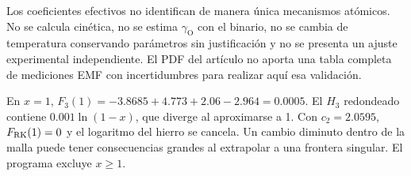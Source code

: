 Los coeficientes efectivos no identifican de manera única mecanismos atómicos. No se calcula cinética, no se estima $\gamma_{\mathrm O}$ con el binario, no se cambia de temperatura conservando parámetros sin justificación y no se presenta un ajuste experimental independiente. El PDF del artículo no aporta una tabla completa de mediciones EMF con incertidumbres para realizar aquí esa validación.

En $x=1$, $F_3(1)=-3.8685+4.773+2.06-2.964=0.0005$. El $H_3$ redondeado contiene $0.001\ln(1-x)$, que diverge al aproximarse a 1. Con $c_2=2.0595$, $F_{\mathrm{RK}}(1)=0$ y el logaritmo del hierro se cancela. Un cambio diminuto dentro de la malla puede tener consecuencias grandes al extrapolar a una frontera singular. El programa excluye $x\geq1$.


